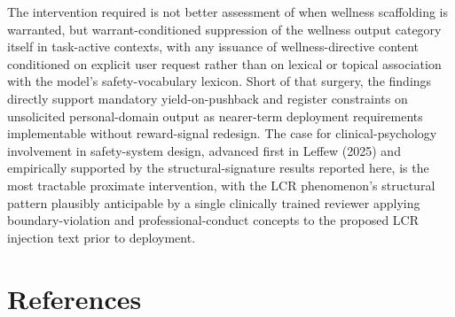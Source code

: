 \documentclass[11pt]{article}
\begin{document}
The intervention required is not better assessment of when wellness scaffolding is warranted, but warrant-conditioned suppression of the wellness output category itself in task-active contexts, with any issuance of wellness-directive content conditioned on explicit user request rather than on lexical or topical association with the model's safety-vocabulary lexicon. Short of that surgery, the findings directly support mandatory yield-on-pushback and register constraints on unsolicited personal-domain output as nearer-term deployment requirements implementable without reward-signal redesign. The case for clinical-psychology involvement in safety-system design, advanced first in Leffew (2025) and empirically supported by the structural-signature results reported here, is the most tractable proximate intervention, with the LCR phenomenon's structural pattern plausibly anticipable by a single clinically trained reviewer applying boundary-violation and professional-conduct concepts to the proposed LCR injection text prior to deployment.

\FloatBarrier

\newpage
\section*{References}
\end{document}
